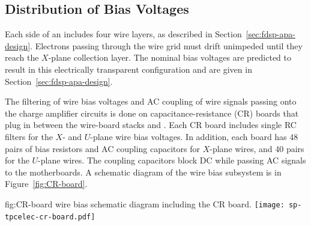 \subsection{Distribution of Bias Voltages}
\label{sec:fdsp-tpcelec-design-bias}


Each side of an  includes four wire layers, as described in Section~\ref{sec:fdsp-apa-design}. 
Electrons passing through the wire grid must drift unimpeded until they reach the $X$-plane 
collection layer. The nominal bias voltages are predicted to result in this electrically 
transparent configuration and are given in Section~\ref{sec:fdsp-apa-design}. 

The filtering of wire bias voltages and AC  coupling of wire signals passing
onto the charge amplifier circuits is done on capacitance-resistance (CR)  boards that plug in between the  wire-board stacks and .
Each CR board includes single RC filters for the $X$- and $U$-plane wire bias voltages. In addition, each board has \num{48} 
pairs of bias resistors and AC coupling capacitors for $X$-plane wires, and \num{40} pairs for the $U$-plane wires. The coupling capacitors block DC while passing AC 
signals to the  motherboards.  A schematic diagram of the   wire bias subsystem is in Figure~\ref{fig:CR-board}.

\begin{dunefigure}
{fig:CR-board}
{  wire bias schematic diagram including the CR board.}
\texttt{[image: sp-tpcelec-cr-board.pdf]}
\end{dunefigure}

